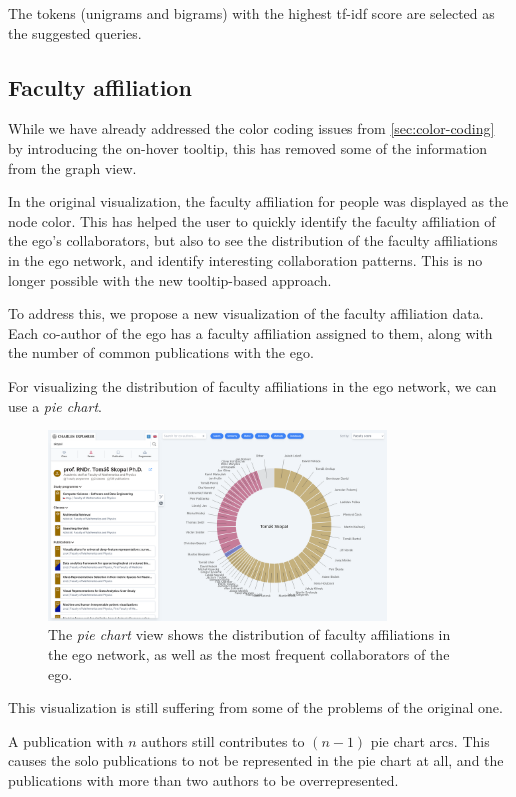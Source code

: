 The tokens (unigrams and bigrams) with the highest tf-idf score are selected as the suggested queries.

\subsection{Faculty affiliation}

While we have already addressed the color coding issues from \ref{sec:color-coding} by introducing the on-hover tooltip, 
this has removed some of the information from the graph view.

In the original visualization, the faculty affiliation for people was displayed as the node color.
This has helped the user to quickly identify the faculty affiliation of the ego's collaborators, 
but also to see the distribution of the  faculty affiliations in the ego network, 
and identify interesting collaboration patterns. 
This is no longer possible with the new tooltip-based approach.

To address this, we propose a new visualization of the faculty affiliation data.
Each co-author of the ego has a faculty affiliation assigned to them, along with the number of common publications with the ego.

For visualizing the distribution of faculty affiliations in the ego network, we can use a \textit{pie chart}.

\begin{figure}[ht!]
    \captionsetup{width=.9\linewidth}
    \includegraphics[width=0.8\textwidth]{../img/pie-chart.png}
    \centering
    \caption{The \textit{pie chart} view shows the distribution of faculty affiliations in the ego network, as well as the most frequent collaborators of the ego.}
\end{figure}

This visualization is still suffering from some of the problems of the original one. 

A publication with $n$ authors still contributes to $(n-1)$ pie chart arcs. 
This causes the solo publications to not be represented in the pie chart at all, and the publications with more than two authors to be overrepresented.

